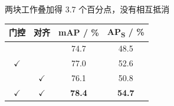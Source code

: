 \begin{frame}{两块工作叠加得 3.7 个百分点，没有相互抵消}
  \begin{evidence}
    \begin{table}
      \centering
      \begin{tabular}{cc S[table-format=2.1] S[table-format=2.1]}
        \toprule
        {门控} & {对齐} & {mAP / \%} & {AP\textsubscript{S} / \%} \\
        \midrule
                   &            & 74.7 & 48.5 \\
        $\checkmark$ &            & 77.0 & 52.6 \\
                   & $\checkmark$ & 76.1 & 50.8 \\
        $\checkmark$ & $\checkmark$ & \bfseries 78.4 & \bfseries 54.7 \\
        \bottomrule
      \end{tabular}
    \end{table}
  \end{evidence}

\end{frame}
